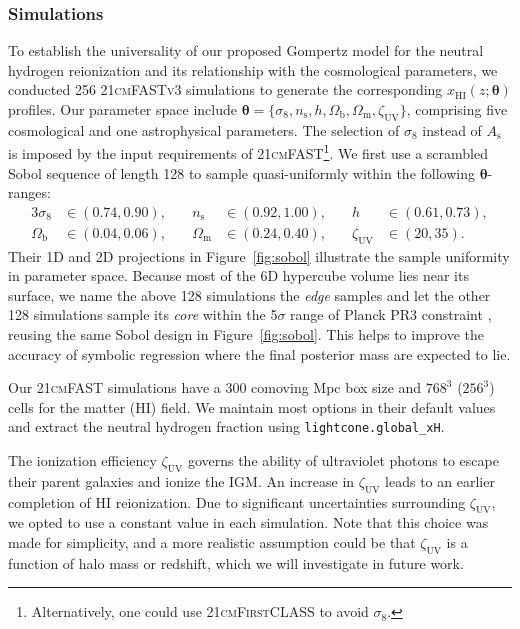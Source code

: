 \documentclass[12pt]{article}
\newcommand{\vtheta}{\boldsymbol{\theta}}
\newcommand{\As}{A_\mathrm{s}}
\newcommand{\ns}{n_\mathrm{s}}
\newcommand{\Omegam}{\Omega_\mathrm{m}}
\newcommand{\Omegab}{\Omega_\mathrm{b}}
\newcommand{\zetaUV}{\zeta_\mathrm{UV}}
\newcommand{\HI}{\mathrm{HI}}
\begin{document}
\subsubsection*{Simulations}
\label{sec:sims}

To establish the universality of our proposed Gompertz model for the
neutral hydrogen reionization and its relationship with the cosmological
parameters, we conducted 256 \textsc{21cmFASTv3} simulations to generate
the corresponding $x_\HI(z; \vtheta)$ profiles.
Our parameter space include $\vtheta = \{\sigma_8, \ns, h, \Omegab,
\Omegam, \zetaUV\}$, comprising five cosmological and one astrophysical
parameters.
The selection of $\sigma_8$ instead of $\As$ is imposed by the input
requirements of \textsc{21cmFAST}\footnote{Alternatively, one could use
\textsc{21cmFirstCLASS}\cite{Flitter2024} to avoid $\sigma_8$.}.
We first use a scrambled Sobol sequence \cite{Sobol1967, Owen1998} of
length 128 to sample quasi-uniformly within the following
$\vtheta$-ranges:
%
\begin{alignat}{3}
\label{eq:prior}
\sigma_8 &\in (0.74, 0.90), &\quad
\ns &\in (0.92, 1.00), &\quad
h &\in (0.61, 0.73), \nonumber\\
\Omegab &\in (0.04, 0.06), &\quad
\Omegam &\in (0.24, 0.40), &\quad
\zetaUV &\in (20, 35).
\end{alignat}
%
Their 1D and 2D projections in Figure~\ref{fig:sobol} illustrate the sample
uniformity in parameter space.
Because most of the 6D hypercube volume lies near its surface, we name
the above 128 simulations the \emph{edge} samples and let the other 128
simulations sample its \emph{core} within the 5$\sigma$ range of Planck
PR3 constraint \cite{Planck2020a}, reusing the same Sobol design in
Figure~\ref{fig:sobol}.
This helps to improve the accuracy of symbolic regression where the
final posterior mass are expected to lie.

Our \textsc{21cmFAST} simulations have a 300 comoving Mpc box size and
$768^3$ ($256^3$) cells for the matter (HI) field.
We maintain most options in their default values and extract the
neutral hydrogen fraction using \texttt{lightcone.global\_xH}.

The ionization efficiency $\zetaUV$ governs the ability of ultraviolet
photons to escape their parent galaxies and ionize the IGM. An increase
in $\zetaUV$ leads to an earlier completion of HI reionization.
Due to significant uncertainties surrounding $\zetaUV$, we opted to use
a constant value in each simulation.
Note that this choice was made for simplicity, and a more realistic
assumption could be that $\zetaUV$ is a function of halo mass
\cite{Park2019} or redshift, which we will investigate in future
work.
\end{document}
